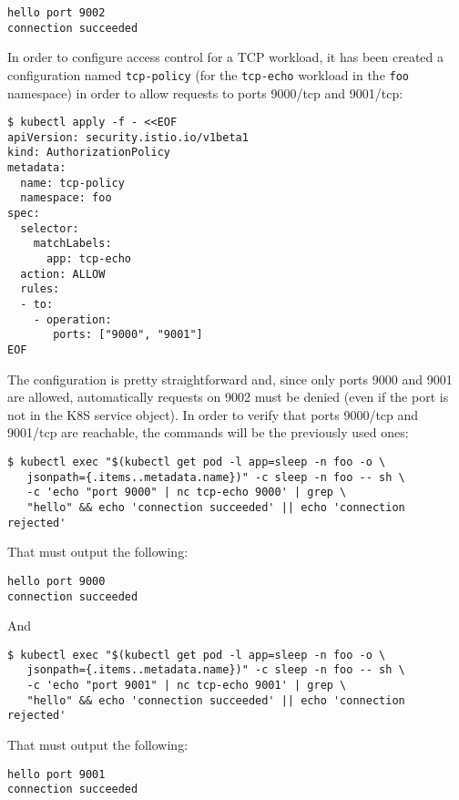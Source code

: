 \begin{lstlisting}
hello port 9002
connection succeeded
\end{lstlisting}

In order to configure access control for a TCP workload, it has been created a configuration named \texttt{tcp-policy} (for the \texttt{tcp-echo} workload in the \texttt{foo} namespace) in order to allow requests to ports 9000/tcp and 9001/tcp: 

\begin{lstlisting}
$ kubectl apply -f - <<EOF
apiVersion: security.istio.io/v1beta1
kind: AuthorizationPolicy
metadata:
  name: tcp-policy
  namespace: foo
spec:
  selector:
    matchLabels:
      app: tcp-echo
  action: ALLOW
  rules:
  - to:
    - operation:
       ports: ["9000", "9001"]
EOF
\end{lstlisting}

\noindent The configuration is pretty straightforward and, since only ports 9000 and 9001 are allowed, automatically requests on 9002 must be denied (even if the port is not in the K8S service object). In order to verify that ports 9000/tcp and 9001/tcp are reachable, the commands will be the previously used ones:

\begin{lstlisting}
$ kubectl exec "$(kubectl get pod -l app=sleep -n foo -o \
   jsonpath={.items..metadata.name})" -c sleep -n foo -- sh \ 
   -c 'echo "port 9000" | nc tcp-echo 9000' | grep \
   "hello" && echo 'connection succeeded' || echo 'connection rejected'
\end{lstlisting}

\noindent That must output the following:

\begin{lstlisting}
hello port 9000
connection succeeded
\end{lstlisting}

\noindent And

\begin{lstlisting}
$ kubectl exec "$(kubectl get pod -l app=sleep -n foo -o \
   jsonpath={.items..metadata.name})" -c sleep -n foo -- sh \ 
   -c 'echo "port 9001" | nc tcp-echo 9001' | grep \
   "hello" && echo 'connection succeeded' || echo 'connection rejected'
\end{lstlisting}

\noindent That must output the following:

\begin{lstlisting}
hello port 9001
connection succeeded
\end{lstlisting}

